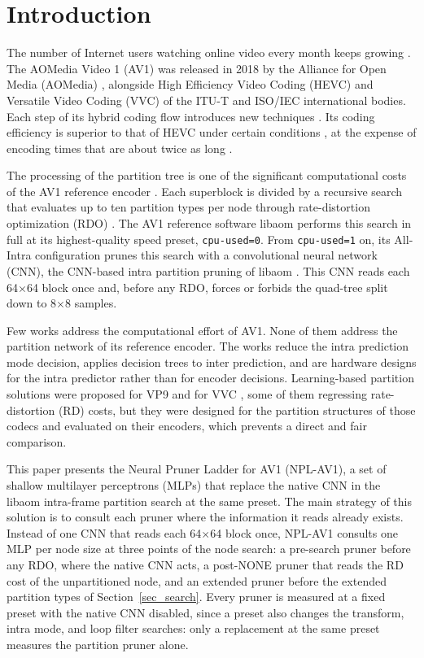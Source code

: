 \documentclass[conference]{IEEEtran}
\begin{document}
\section{Introduction}
\label{sec_intro}

The number of Internet users watching online video every month keeps growing
\cite{statista}. The AOMedia Video 1 (AV1) was released in 2018 by the Alliance
for Open Media (AOMedia) \cite{av1site}, alongside High Efficiency Video
Coding (HEVC) \cite{hevc} and Versatile Video Coding (VVC) \cite{vvc} of
the ITU-T and ISO/IEC international bodies. Each step of its hybrid coding flow introduces new techniques
\cite{han2021,chen2018}. Its coding efficiency
is superior to that of HEVC under certain conditions \cite{grois2016}, at the
expense of encoding times that are about twice as long \cite{layek2017}.

The processing of the partition tree is one of the significant computational costs of
the AV1 reference encoder \cite{bender2023}. Each superblock is divided by a
recursive search that evaluates up to ten partition types per node through
rate-distortion optimization (RDO) \cite{sullivan1998}. The AV1 reference software
libaom \cite{libaom} performs this search in full at its highest-quality speed
preset, \texttt{cpu-used=0}. From \texttt{cpu-used=1} on, its All-Intra
configuration prunes this search with a convolutional neural network (CNN), the
CNN-based intra partition pruning of libaom \cite{libaom}. This CNN
reads each 64$\times$64 block once and, before any RDO, forces or forbids the
quad-tree split down to 8$\times$8 samples.

Few works address the computational effort of AV1. None of them address the
partition network of its reference encoder. The works \cite{xu2020,xu2021,jeong2019} reduce
the intra prediction mode decision, \cite{kim2019} applies decision trees to
inter prediction, and \cite{correa2020,netto2022} are hardware designs for the
intra predictor rather than for encoder decisions. Learning-based partition
solutions were proposed for VP9 \cite{paul2020} and for VVC
\cite{chen2019,he2021,saldanha2022,song2024,kherchouche2024,kherchouche2025},
some of them regressing rate-distortion (RD) costs, but they were designed for
the partition structures of those codecs and evaluated on their encoders, which
prevents a direct and fair comparison.

This paper presents the Neural Pruner Ladder for AV1 (NPL-AV1), a set of shallow
multilayer perceptrons (MLPs) that replace the native CNN in the libaom
intra-frame partition search at the same preset. The main strategy of this solution is to consult
each pruner where the information it reads already exists. Instead of one CNN
that reads each 64$\times$64 block once, NPL-AV1 consults one MLP per node size
at three points of the node search: a pre-search pruner before any RDO, where
the native CNN acts, a post-NONE pruner that reads the RD cost of the
unpartitioned node, and an extended pruner before the extended partition types
of Section~\ref{sec_search}. Every pruner is measured at a fixed
preset with the native CNN disabled, since a preset also changes the transform,
intra mode, and loop filter searches: only a replacement at the same preset
measures the partition pruner alone.
\end{document}
